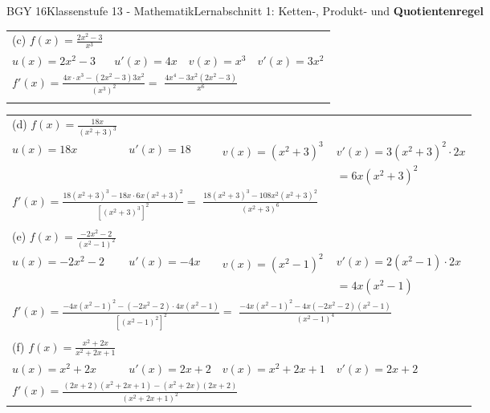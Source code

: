 \documentclass[oneside,openany,headings=optiontotoc,11pt,numbers=noenddot]{scrreprt}
\begin{document}
\begin{worksheet}{BGY 16}{Klassenstufe 13 - Mathematik}{Lernabschnitt 1: Ketten-, Produkt- und \textbf{Quotientenregel}}
\begin{framed}
\begin{tabularx}{\textwidth}{llll}
				(c) \(f(x) = \frac{2x^2-3}{x^3}\)\\
				\(u(x) = 2x^2-3\) & \(u'(x) = 4x\) & \(v(x) = x^3\) & \(v'(x) = 3x^2\)\\
				\multicolumn{4}{l}{\(f'(x) = \frac{4x\cdot{}x^3 - (2x^2-3)3x^2}{(x^3)^2} =\) \colorbox{green!10}{\(\frac{4x^4-3x^2(2x^2-3)}{x^6}\)}}\\
				\\
			\end{tabularx}
			\begin{tabularx}{\textwidth}{llll}
				(d) \(f(x) = \frac{18x}{(x^2+3)^3}\)\\
				\(u(x) = 18x\) & \(u'(x) = 18\) & \(v(x) = (x^2+3)^3\) & \(v'(x) = 3(x^2+3)^2\cdot{}2x\)\\
				& & & \(= 6x(x^2+3)^2\)\\
				\multicolumn{4}{l}{\(f'(x) = \frac{18(x^2+3)^3 - 18x\cdot{}6x(x^2+3)^2}{[(x^2+3)^3]^2} =\) \colorbox{green!10}{\(\frac{18(x^2+3)^3-108x^2(x^2+3)^2}{(x^2+3)^6}\)}}\\
				\\
				(e) \(f(x) = \frac{-2x^2-2}{(x^2-1)^2}\)\\
				\(u(x) = -2x^2-2\) & \(u'(x) = -4x\) & \(v(x) = (x^2-1)^2\) & \(v'(x) = 2(x^2-1)\cdot{}2x\)\\
				& & & \(= 4x(x^2-1)\)\\
				\multicolumn{4}{l}{\(f'(x) = \frac{-4x(x^2-1)^2 - (-2x^2-2)\cdot{}4x(x^2-1)}{[(x^2-1)^2]^2} =\) \colorbox{green!10}{\(\frac{-4x(x^2-1)^2 - 4x(-2x^2-2)(x^2-1)}{(x^2-1)^4}\)}}\\
				\\
				(f) \(f(x) = \frac{x^2+2x}{x^2+2x+1}\)\\
				\(u(x) = x^2+2x\) & \(u'(x) = 2x+2\) & \(v(x) = x^2+2x+1\) & \(v'(x) = 2x+2\)\\
				\multicolumn{4}{l}{\colorbox{green!10}{\(f'(x) = \frac{(2x+2)(x^2+2x+1)-(x^2+2x)(2x+2)}{(x^2+2x+1)^2}\)}}
			\end{tabularx}
		\end{framed}
	\end{worksheet}
\end{document}
